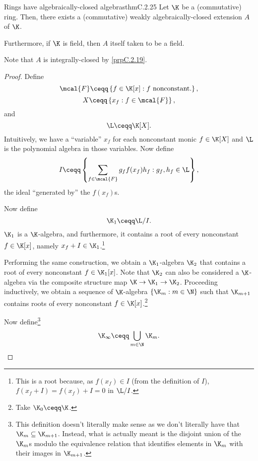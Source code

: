 \begin{thm}{Rings have algebraically-closed algebras}{thmC.2.25}
	Let $\K$ be a (commutative) ring.  Then, there exists a (commutative) weakly algebraically-closed extension $A$ of $\K$.
	
	Furthermore, if $\K$ is field, then $A$ itself taken to be a field.
	\begin{rmk}
		Note that $A$ is integrally-closed by \cref{prpC.2.19}.
	\end{rmk}
	\begin{proof}
		Define
		\begin{equation}
			\mcal{F}\ceqq \left\{ f\in \K [x]:f\text{ nonconstant.}\right\} ,
		\end{equation}
		\begin{equation}
			X\ceqq \left\{ x_f:f\in \mcal{F}\right\} ,
		\end{equation}
			and
		\begin{equation}
			\L \ceqq \K [X].
		\end{equation}
		Intuitively, we have a ``variable'' $x_f$ for each nonconstant monic $f\in \K [X]$ and $\L$ is the polynomial algebra in those variables.  Now define
		\begin{equation}
			I\ceqq \left\{ \sum _{f\in \mcal{F}}g_ff(x_f)h_f:g_f,h_f\in \L \right\} ,
		\end{equation}
		the ideal ``generated by'' the $f(x_f)$s.
		
		Now define
		\begin{equation}\label{eqnC.2.31}
			\K _1\ceqq \L /I.
		\end{equation}
		$\K _1$ is a $\K$-algebra, and furthermore, it contains a root of every nonconstant $f\in \K [x]$, namely $x_f+I\in \K _1$.\footnote{This is a root because, as $f(x_f)\in I$ (from the definition of $I$), $f(x_f+I)=f(x_f)+I=0$ in $\L /I$.}
		
		Performing the same construction, we obtain a $\K _1$-algebra $\K _2$ that contains a root of every nonconstant $f\in \K _1[x]$.  Note that $\K _2$ can also be considered a $\K$-algebra via the composite structure map $\K \rightarrow \K _1\rightarrow \K _2$.  Proceeding inductively, we obtain a sequence of $\K$-algebra $\{ \K _m:m\in \N \}$ such that $\K _{m+1}$ contains roots of every nonconstant $f\in \K [x]$.\footnote{Take $\K _0\ceqq \K$.}
		
		Now define\footnote{This definition doesn't literally make sense as we don't literally have that $\K _m\subseteq \K _{m+1}$.  Instead, what is actually meant is the disjoint union of the $\K _m$s modulo the equivalence relation that identifies elements in $\K _m$ with their images in $\K _{m+1}$.}
		\begin{equation}
			\K _{\infty}\ceqq \bigcup _{m\in \N}\K _m.
		\end{equation}
		

\end{proof}
\end{thm}

